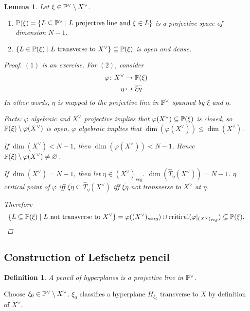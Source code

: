 \documentclass[A4paper, british, reqno]{amsart}
\theoremstyle{darkgreentheorem}
\newtheorem{lm}[thm]{Lemma}
\theoremstyle{darkbluedefinition}
\newtheorem{defn}[thm]{Definition}
\theoremstyle{darkredexample}
\theoremstyle{remark}
\newcommand{\1}{\mathbbm{1}}
\newcommand{\dual}{^{\vee}}
\newcommand{\sub}{\subseteq}
\begin{document}
\begin{lm}
    Let $\xi\in \P\dual\setminus X\dual$.
    \begin{enumerate}
	\item $\P(\xi)=\{L\sub \P\dual \mid L \text{ projective line and }\xi\in L\}$ is a projective space of dimension $N-1$.
	\item $\{L\in \P(\xi)\mid L \text{ transverse to }X\dual \}\sub \P(\xi)$ is open and dense.
    \end{enumerate}
    \begin{proof}
	$(1)$ is an exercise.
	For $(2)$, consider 
	\begin{align*}
	    \varphi\colon X\dual &\to \P(\xi) \\
	    \eta &\mapsto \overline{\xi\eta}
	\end{align*}
	In other words, $\eta$ is mapped to the projective line in $\P\dual$ spanned by $\xi $ and $\eta$.

	Facts:
	$\varphi$ algebraic and $X\dual$ projective implies that $\varphi(X\dual)\sub \P(\xi)$ is closed, so $\P(\xi)\setminus \varphi(X\dual)$ is open.
	$\varphi$ algebraic implies that $\dim(\varphi(X\dual))\leqslant \dim(X\dual)$.

	If $\dim(X\dual)<N-1$, then $\dim(\varphi(X\dual))<N-1$.
	Hence $\P(\xi)\setminus \varphi(X\dual)\neq \varnothing$.
	
	If $\dim(X\dual)=N-1$, then let $\eta\in (X\dual)_{reg}$.
	$\dim(\hat{T}_{\eta}(X\dual))=N-1$.
	$\eta$ critical point of $\varphi $ iff $\overline{\xi\eta}\sub \hat{T}_{\eta}(X\dual)$ iff $\overline{\xi\eta}$ not transverse to $X\dual$ at $\eta$.

	Therefore
	\[ \{L\sub \P(\xi)\mid L \text{ not transverse to }X\dual\}=\varphi((X\dual)_{sing})\cup \operatorname{critical}(\varphi|_{(X\dual)_{reg}})\subsetneq \P(\xi). \]
    \end{proof}
\end{lm}

\subsection{Construction of Lefschetz pencil}

\begin{defn}
    A \textit{pencil of hyperplanes} is a projective line in $\P\dual$.
\end{defn}

Choose $\xi_{0}\in \P\dual\setminus X\dual$.
$\xi_{0}$ classifies a hyperplane $H_{\xi_{0}}$ transverse to $X$ by definition of $X\dual$.
\end{document}
